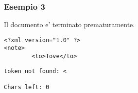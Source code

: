 \documentclass[italian,a4paper]{article}
\begin{document}
\subsubsection{Esempio 3}

Il documento e' terminato prematuramente.

\begin{mdframed}[frametitle=Input]
\begin{verbatim}
<?xml version="1.0" ?>
<note>    
        <to>Tove</to>
\end{verbatim}
\end{mdframed}

\begin{mdframed}[frametitle=Output]
\begin{verbatim}
token not found: <

Chars left: 0
\end{verbatim}
\end{mdframed}
\end{document}
